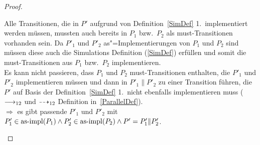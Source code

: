 \begin{proof}
\begin{enumerate}
      Alle Transitionen, die in $P'$ aufgrund von Definition~\ref{SimDef} 1.\
      implementiert werden müssen, mussten auch bereits in $P_1$ bzw.\ $P_2$
      als must-Transitionen vorhanden sein. Da $P'_1$ und $P'_2$
      as"=Implementierungen von $P_1$ und $P_2$ sind müssen diese auch die
      Simulations Definition (\ref{SimDef}) erfüllen und somit die
      must-Transitionen aus $P_1$ bzw.\ $P_2$ implementieren.\\
      Es kann nicht passieren, dass $P_1$ und $P_2$ must-Transitionen
      enthalten, die $P'_1$ und $P'_2$ implementieren müssen und dann in
      $P'_1\|P'_2$ zu einer Transition führen, die $P'$ auf Basis der
      Definition~\ref{SimDef} 1.\ nicht ebenfalls implementieren muss ($\must
      _{12}$ und $\may _{12}$ Definition in~\ref{ParallelDef}).\\
      $\Rightarrow$ es gibt passende $P'_1$ und $P'_2$ mit $P'_1\in\mathrm{as}\text{-}\mathrm{impl} (P_1)
      \land P'_2\in\mathrm{as}\text{-}\mathrm{impl} (P_2) \land P'=P'_1\|P'_2$.
  \end{enumerate}
\end{proof}
